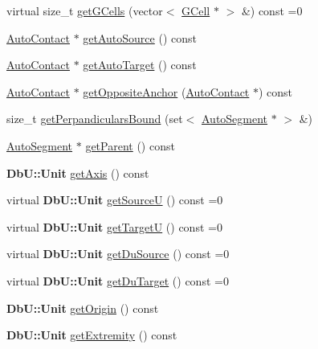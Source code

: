 \begin{DoxyCompactItemize}
\item 
virtual size\-\_\-t \hyperlink{classKatabatic_1_1AutoSegment_ad9d24f97e55e2f538ed1c907bee99e81}{get\-G\-Cells} (vector$<$ \hyperlink{classKatabatic_1_1GCell}{G\-Cell} $\ast$ $>$ \&) const =0
\item 
\hyperlink{classKatabatic_1_1AutoContact}{Auto\-Contact} $\ast$ \hyperlink{classKatabatic_1_1AutoSegment_afb5b4d8bddc75cd604c7a68aa5943c12}{get\-Auto\-Source} () const 
\item 
\hyperlink{classKatabatic_1_1AutoContact}{Auto\-Contact} $\ast$ \hyperlink{classKatabatic_1_1AutoSegment_a5a35baf84e1e3531c38a6132fb8118fb}{get\-Auto\-Target} () const 
\item 
\hyperlink{classKatabatic_1_1AutoContact}{Auto\-Contact} $\ast$ \hyperlink{classKatabatic_1_1AutoSegment_ac2d254eb530ff299dad804100198cc24}{get\-Opposite\-Anchor} (\hyperlink{classKatabatic_1_1AutoContact}{Auto\-Contact} $\ast$) const 
\item 
size\-\_\-t \hyperlink{classKatabatic_1_1AutoSegment_a5a63602ccc44f51012f10d138e1480c4}{get\-Perpandiculars\-Bound} (set$<$ \hyperlink{classKatabatic_1_1AutoSegment}{Auto\-Segment} $\ast$ $>$ \&)
\item 
\hyperlink{classKatabatic_1_1AutoSegment}{Auto\-Segment} $\ast$ \hyperlink{classKatabatic_1_1AutoSegment_a0ca0f04492f7365856ccceb905968bb5}{get\-Parent} () const 
\item 
{\bf Db\-U\-::\-Unit} \hyperlink{classKatabatic_1_1AutoSegment_af85576c58c70007850ad56e238e8d266}{get\-Axis} () const 
\item 
virtual {\bf Db\-U\-::\-Unit} \hyperlink{classKatabatic_1_1AutoSegment_aeaa1543880686755e389c4807128428f}{get\-Source\-U} () const =0
\item 
virtual {\bf Db\-U\-::\-Unit} \hyperlink{classKatabatic_1_1AutoSegment_a828fef2716cc9c370d6d170bb96556ec}{get\-Target\-U} () const =0
\item 
virtual {\bf Db\-U\-::\-Unit} \hyperlink{classKatabatic_1_1AutoSegment_ab4881df67bd8f036d0199ed6540fe774}{get\-Du\-Source} () const =0
\item 
virtual {\bf Db\-U\-::\-Unit} \hyperlink{classKatabatic_1_1AutoSegment_a0644d656eedc71dba2fb3c6c0d83ed3f}{get\-Du\-Target} () const =0
\item 
{\bf Db\-U\-::\-Unit} \hyperlink{classKatabatic_1_1AutoSegment_acedb5dbab9d0c872dc476fdbefff431c}{get\-Origin} () const 
\item 
{\bf Db\-U\-::\-Unit} \hyperlink{classKatabatic_1_1AutoSegment_a6cf0ef9d591a27428ad29332e188b616}{get\-Extremity} () const 

\end{DoxyCompactItemize}
